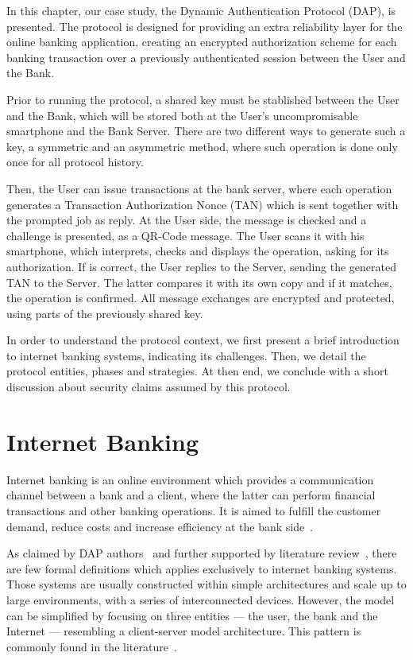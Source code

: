 In this chapter\label{chap:dap}, our case study, the Dynamic Authentication Protocol (DAP), is presented. The protocol is designed for providing an extra reliability layer for the online banking application, creating an encrypted authorization scheme for each banking transaction over a previously authenticated session between the User and the Bank.

Prior to running the protocol, a shared key must be stablished between the User and the Bank, which will be stored both at the User's uncompromisable smartphone and the Bank Server. There are two different ways to generate such a key, a symmetric and an asymmetric method, where such operation is done only once for all protocol history.

Then, the User can issue transactions at the bank server, where each operation generates a Transaction Authorization Nonce (TAN) which is sent together with the prompted job as reply. At the User side, the message is checked and a challenge is presented, as a QR-Code message. The User scans it with his smartphone, which interprets, checks and displays the operation, asking for its authorization. If is correct, the User replies to the Server, sending the generated TAN to the Server. The latter compares it with its own copy and if it matches, the operation is confirmed. All message exchanges are encrypted and protected, using parts of the previously shared key.

In order to understand the protocol context, we first present a brief introduction to internet banking systems, indicating its challenges. Then, we detail the protocol entities, phases and strategies. At then end, we conclude with a short discussion about security claims assumed by this protocol.





\section{Internet Banking}
Internet banking is an online environment which provides a communication channel between a bank and a client, where the latter can perform financial transactions and other banking operations. It is aimed to fulfill the customer demand, reduce costs and increase efficiency at the bank side~\cite{Hutchinson2003}.

As claimed by DAP authors~\cite[p.8]{Peotta2012} and further supported by literature review~\cite{Hutchinson2003}, there are few formal definitions which applies exclusively to internet banking systems. Those systems are usually constructed within simple architectures and scale up to large environments, with a series of interconnected devices. However, the model can be simplified by focusing on three entities --- the user, the bank and the Internet --- resembling a client-server model architecture. This pattern is commonly found in the literature~\cite{Hutchinson2003}.

